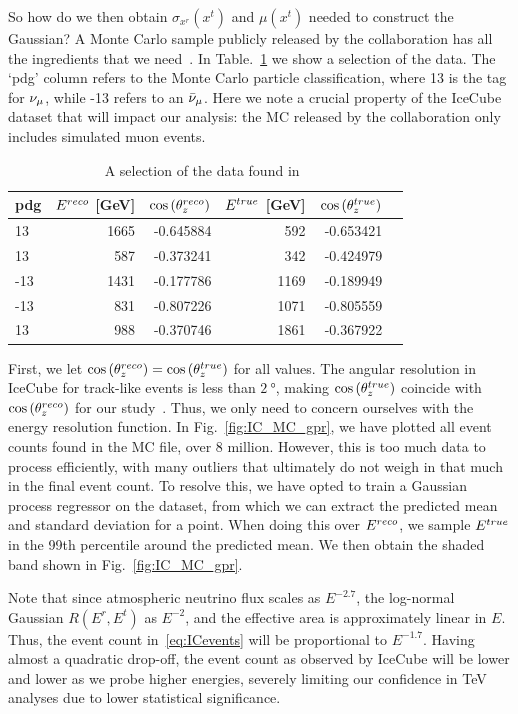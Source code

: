 So how do we then obtain $\sigma_{x^r}(x^t)$ and $\mu(x^t)$ needed to construct the Gaussian? A Monte Carlo sample publicly released by the 
collaboration has all the ingredients that we need~\cite{IC2016}. In Table.~\ref{table:IC_MC} we show a selection of the data.
The `pdg' column refers to the Monte Carlo particle classification, where 13 is the tag for $\nu_\mu$, while -13 refers
to an $\bar{\nu}_\mu$. Here we note a crucial property of the IceCube dataset that will impact our analysis: the MC released by the collaboration
only includes simulated muon events.

\begin{table}[ht]
    \centering
    \begin{tabular}{lrrrrr}
        \hline \hline
        pdg &      $E^{reco}$ [\si{\GeV}] &     $\cos{(\theta_z^{reco})}$ &       $E^{true}$ [\si{\GeV}] &     $\cos{(\theta_z^{true})}$ \\
        \hline
         13 &  1665 & -0.645884 &    592 & -0.653421 \\
         13 &   587 & -0.373241 &    342 & -0.424979 \\
        -13 &  1431 & -0.177786 &   1169 & -0.189949 \\
        -13 &   831 & -0.807226 &   1071 & -0.805559 \\
         13 &   988 & -0.370746 &   1861 & -0.367922 \\
         \hline \hline
  \end{tabular}
  \caption{A selection of the data found in~\cite{IC2016}}
  \label{table:IC_MC}
\end{table}

First, we let $\cos{(\theta_z^{reco})} = \cos{(\theta_z^{true})}$ for all values. The angular resolution in IceCube for track-like events is less than $\SI{2}{\degree}$, making $\cos{(\theta_z^{true})}$ coincide with $\cos{(\theta_z^{reco})}$ for our study~\cite{IC2020}.
Thus, we only need to concern ourselves with the energy resolution function.
In Fig.~\ref{fig:IC_MC_gpr}, we have plotted all event counts found in the MC file, over 8 million. However, this is too much data to process efficiently, with many outliers that ultimately do not weigh in 
that much in the final event count. To resolve this, we have opted to train a Gaussian process regressor on the dataset, from which we can extract the predicted mean and standard deviation for a point.
When doing this over $E^{reco}$, we sample $E^{true}$ in the 99th percentile around the predicted mean. We then obtain the shaded band shown in Fig.~\ref{fig:IC_MC_gpr}.

Note that since atmospheric neutrino flux scales as $E^{-2.7}$, the log-normal Gaussian $R(E^r, E^t)$ as $E^{-2}$,
and the effective area is approximately linear in $E$.
Thus, the event count in~\ref{eq:ICevents} will be proportional to $E^{-1.7}$. Having almost a quadratic drop-off, the event count as 
observed by IceCube will be lower and lower as we probe higher energies, severely limiting our confidence in \si{\TeV} analyses due to 
lower statistical significance.

